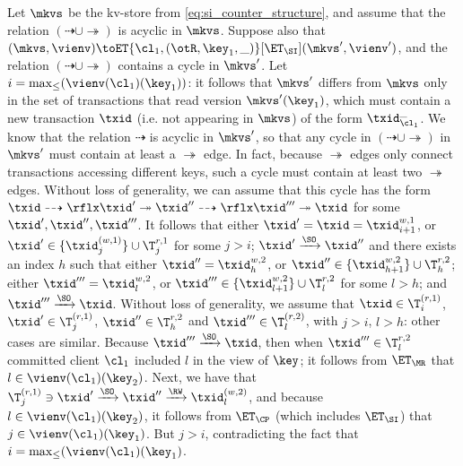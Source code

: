 {Let $\mkvs$ be the kv-store from \cref{eq:si_counter_structure}, and assume that the relation $(\dashrightarrow \cup \twoheadrightarrow)$ 
is acyclic in $\mkvs$. Suppose also that 
$(\mkvs, \vienv) \toET{\cl_{1}, (\otR, \key_{1}, \_)}[\ET_\SI] (\mkvs', \vienv')$, and the relation
$(\dashrightarrow \cup \twoheadrightarrow)$ contains a cycle in $\mkvs'$. Let $i = \max_{\leq}(\vienv(\cl_1)(\key_1))$: 
it follows that $\mkvs'$ differs from $\mkvs$ only in the set of transactions that read version $\mkvs'(\key_{1})$, 
which must contain a new transaction $\txid$ (i.e. not appearing in $\mkvs$) of the form $\txid_{\cl_{1}}^{\_}$.
We know that the relation $\dashrightarrow$ is acyclic in $\mkvs'$, so that 
any cycle in $(\dashrightarrow \cup \twoheadrightarrow)$ in $\mkvs'$ must contain at least a $\twoheadrightarrow$ 
edge. In fact, because $\twoheadrightarrow$ edges only connect transactions accessing different keys, such 
a cycle must contain at least two $\twoheadrightarrow$ edges. Without loss of generality, we can assume that 
this cycle has the form $\txid \dashrightarrow\rflx \txid' \twoheadrightarrow \txid'' \dashrightarrow\rflx \txid''' \twoheadrightarrow \txid$ 
for some $\txid', \txid'', \txid'''$. It follows that either $\txid' = \txid = \txid^{w,1}_{i+1}$, or $\txid' \in \{\txid^{(w,1)}_{j}\} \cup \T^{r,1}_{j}$ 
for some $j > i$;  $\txid' \xrightarrow{\SO} \txid''$ and there exists an index $h$ such that either $\txid'' = \txid^{w,2}_{h}$, 
or $\txid'' \in \{\txid^{w,2}_{h+1}\} \cup \T^{r,2}_{h}$; 
either $\txid''' = \txid^{w,2}_{l}$, or $\txid''' \in \{\txid^{w,2}_{l+1}\} \cup \T^{r,2}_{l}$ for some $l > h$; and $\txid''' \xrightarrow{\SO} \txid$.
Without loss of generality, we assume that $\txid \in \T^{(r,1)}_{i}$, 
$\txid' \in \T^{(r,1)}_{j}$, $\txid'' \in \T^{r,2}_{h}$ and $\txid''' \in \T^{(r,2)}_{l}$, with $j > i$, $l > h$: other cases are similar. 
Because $\txid''' \xrightarrow{\SO} \txid$, then when $\txid''' \in \T^{r,2}_{l}$ committed client $\cl_1$ included $l$ 
in the view of $\key$; it follows from $\ET_{\MR}$  
that $l \in \vienv(\cl_{1})(\key_{2})$. Next, we have that $\T^{(r,1)}_{j} \ni \txid' \xrightarrow{\SO} \txid'' \xrightarrow{\RW} \txid^{(w,2)}_{l}$, 
and because $l \in \vienv(\cl_{1})(\key_{2})$, it follows from $\ET_{\CP}$ (which includes $\ET_{\SI}$) that 
$j \in \vienv(\cl_{1})(\key_{1})$. But $j > i$, contradicting the fact that $i = \max_{\leq}(\vienv(\cl_1)(\key_1)$.

}
